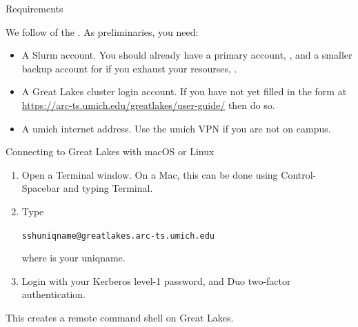 \begin{frame}{Requirements}

We follow  of the . As preliminaries, you need:

\begin{itemize}
  \item A Slurm account. You should already have a primary account, , and a smaller backup account for if you exhaust your resourses, . 
   \item A Great Lakes cluster login account. If you have not yet filled in the form at \url{https://arc-ts.umich.edu/greatlakes/user-guide/} then do so.
   \item A umich internet address. Use the umich VPN if you are not on campus.
  \end{itemize}
\end{frame}


\begin{frame}{Connecting to Great Lakes with macOS or Linux}
  \begin{enumerate}
  \item Open a Terminal window. On a Mac, this can be done using Control-Spacebar and typing Terminal.
  \item Type
\begin{knitrout}\small
{}\color{fgcolor}\begin{kframe}
\begin{alltt}
ssh uniqname@greatlakes.arc-ts.umich.edu
\end{alltt}
\end{kframe}
\end{knitrout}
where  is your uniqname.
\item Login with your Kerberos level-1 password, and Duo two-factor authentication.
  \end{enumerate}
This creates a remote command shell on Great Lakes.

\end{frame}



